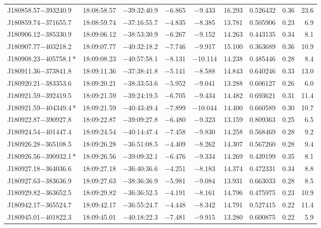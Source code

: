 \begin{table*}
\begin{tabular}{lcccccccr}
J180858.57$-$393240.9 & 18:08:58.57 & $-$39:32:40.9 & $-$6.865 & $-$9.433 & 16.293 & 0.526432 & 0.36 & 23.6 \\
J180859.74$-$371655.7 & 18:08:59.74 & $-$37:16:55.7 & $-$4.835 & $-$8.385 & 13.781 & 0.505906 & 0.23 & 6.9 \\
J180906.12$-$385330.9 & 18:09:06.12 & $-$38:53:30.9 & $-$6.267 & $-$9.152 & 14.263 & 0.443135 & 0.34 & 8.1 \\
J180907.77$-$403218.2 & 18:09:07.77 & $-$40:32:18.2 & $-$7.746 & $-$9.917 & 15.100 & 0.363689 & 0.36 & 10.9 \\
J180908.23$-$405758.1\,* & 18:09:08.23 & $-$40:57:58.1 & $-$8.131 & $-$10.114 & 14.238 & 0.485446 & 0.28 & 8.4 \\
J180911.36$-$373841.8 & 18:09:11.36 & $-$37:38:41.8 & $-$5.141 & $-$8.588 & 14.843 & 0.640246 & 0.33 & 13.0 \\
J180920.21$-$383353.6 & 18:09:20.21 & $-$38:33:53.6 & $-$5.952 & $-$9.041 & 13.288 & 0.606127 & 0.26 & 6.0 \\
J180921.59$-$392419.5 & 18:09:21.59 & $-$39:24:19.5 & $-$6.705 & $-$9.434 & 14.482 & 0.693621 & 0.31 & 11.4 \\
J180921.59$-$404349.4\,* & 18:09:21.59 & $-$40:43:49.4 & $-$7.899 & $-$10.044 & 14.400 & 0.660589 & 0.30 & 10.7 \\
J180922.87$-$390927.8 & 18:09:22.87 & $-$39:09:27.8 & $-$6.480 & $-$9.323 & 13.159 & 0.809363 & 0.25 & 6.5 \\
J180924.54$-$401447.4 & 18:09:24.54 & $-$40:14:47.4 & $-$7.458 & $-$9.830 & 14.258 & 0.568469 & 0.28 & 9.2 \\
J180926.28$-$365108.5 & 18:09:26.28 & $-$36:51:08.5 & $-$4.409 & $-$8.262 & 14.307 & 0.567260 & 0.28 & 9.4 \\
J180926.56$-$390932.1\,* & 18:09:26.56 & $-$39:09:32.1 & $-$6.476 & $-$9.334 & 14.269 & 0.439199 & 0.35 & 8.1 \\
J180927.18$-$364036.6 & 18:09:27.18 & $-$36:40:36.6 & $-$4.251 & $-$8.183 & 14.374 & 0.472331 & 0.34 & 8.8 \\
J180927.63$-$383636.9 & 18:09:27.63 & $-$38:36:36.9 & $-$5.981 & $-$9.084 & 13.931 & 0.663033 & 0.28 & 8.5 \\
J180929.82$-$363652.5 & 18:09:29.82 & $-$36:36:52.5 & $-$4.191 & $-$8.161 & 14.796 & 0.475975 & 0.23 & 10.9 \\
J180942.17$-$365524.7 & 18:09:42.17 & $-$36:55:24.7 & $-$4.448 & $-$8.342 & 14.791 & 0.527415 & 0.22 & 11.4 \\
J180945.01$-$401822.3 & 18:09:45.01 & $-$40:18:22.3 & $-$7.481 & $-$9.915 & 13.280 & 0.600875 & 0.22 & 5.9 \\

\end{tabular}
\end{table*}
